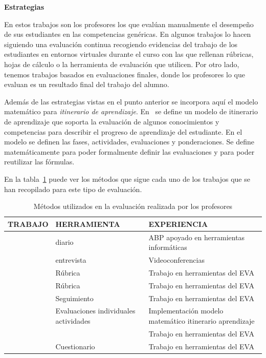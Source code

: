 \bigskip
\textbf{Estrategias}
\bigskip

En estos trabajos son los profesores los que evalúan manualmente el desempeño de sus estudiantes en las competencias genéricas. En algunos trabajos lo hacen siguiendo una evaluación continua recogiendo evidencias del trabajo de los estudiantes en entornos virtuales durante el curso con las que rellenan rúbricas, hojas de cálculo o la herramienta de evaluación que utilicen. Por otro lado, tenemos trabajos basados en evaluaciones finales, donde los profesores lo que evaluan es un resultado final del trabajo del alumno. 

Además de las estrategias vistas en el punto anterior se incorpora aquí el modelo matemático para \emph{itinerario de aprendizaje}. En~\cite{yang2014fine} se define un modelo de itinerario de aprendizaje que soporta la evaluación de algunos conocimientos y competencias para describir el progreso de aprendizaje del estudiante. En el modelo se definen las fases, actividades, evaluaciones y ponderaciones. Se define matemáticamente para poder formalmente definir las evaluaciones y para poder reutilizar las fórmulas. 

En la tabla~\ref{tab:MetodosProfesor} puede ver los métodos que sigue cada uno de los trabajos que se han recopilado para este tipo de evaluación.


\begin{table}
  \begin{center}
  \begin{tabular}{| m{3.5cm} | m{3.5cm} | m{5.5cm} |}
    \hline
    TRABAJO & HERRAMIENTA & EXPERIENCIA \\
    \hline
    \hline
    \cite{lacuesta2009active} & diario  & ABP apoyado en herramientas informáticas \\
    \hline
    \cite{ward2011developing} & entrevista & Videoconferencias \\
    \hline
    \cite{martin2013acquired} & Rúbrica & Trabajo en herramientas del EVA \\
    \hline
    \cite{rodriguez2010portfolio} & Rúbrica & Trabajo en herramientas del EVA  \\
    \hline
    \cite{benlloch2007adapting} & Seguimiento & Trabajo en herramientas del EVA \\
    \hline
    \cite{yang2014fine} & Evaluaciones individuales actividades  & Implementación modelo matemático itinerario aprendizaje \\
    \hline
    \cite{serrano2013hiperion} &  & Trabajo en herramientas del EVA \\
    \hline
    \cite{vizcarro2013assessment} & Cuestionario  & Trabajo en herramientas del EVA \\
    \hline
  \end{tabular}
\end{center}
\caption{Métodos utilizados en la evaluación realizada por los profesores}
\label{tab:MetodosProfesor}
\end{table} 


